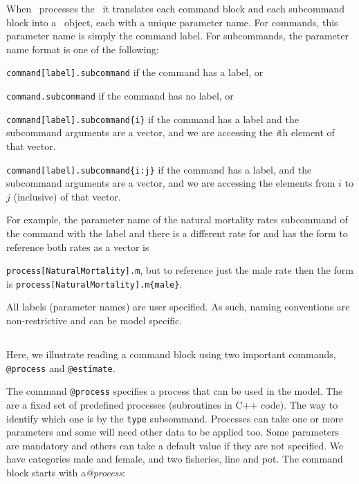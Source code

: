 When \CNAME~processes the \config~it translates each command block and each subcommand block into a \CNAME~object, each with a unique parameter name. For commands, this parameter name is simply the command label. For subcommands, the parameter name format is one of the following:

\begin{description}
\item \texttt{command[label].subcommand} if the command has a label, or
\item \texttt{command.subcommand} if the command has no label, or
\item \texttt{command[label].subcommand\{i\}} if the command has a label and the subcommand arguments are a vector, and we are accessing the  \emph{i}th element of that vector.
\item \texttt{command[label].subcommand\{i:j\}} if the command has a label, and the subcommand arguments are a vector, and we are accessing the elements from $i$ to $j$ (inclusive) of that vector.
\end{description}

For example, the parameter name of the natural mortality rates subcommand  of the command  with the label  and there is a different rate for  and  has the form to reference both rates as a vector  is

\texttt{process[NaturalMortality].m}, but to reference just the male rate then the form is
\texttt{process[NaturalMortality].m\{male\}}.

All labels (parameter names) are user specified. As such, naming conventions are non-restrictive and can be model specific.


\subsection{\label{sec:Readingcommandblock}}

Here, we illustrate reading a command block using two important commands, \texttt{@process} and \texttt{@estimate}.

The command \texttt{@process} specifies a process that can be used in the model. The are a fixed set of predefined processes (subroutines in C++ code). The way to identify which one is by the \texttt{type} subsommand. Processes can take one or more parameters and some will need other data to be applied too. Some parameters are mandatory and others can take a default value if they are not specified.
We have categories male and female, and two fisheries, line and pot. The command block starts with a\textit{@process}:

